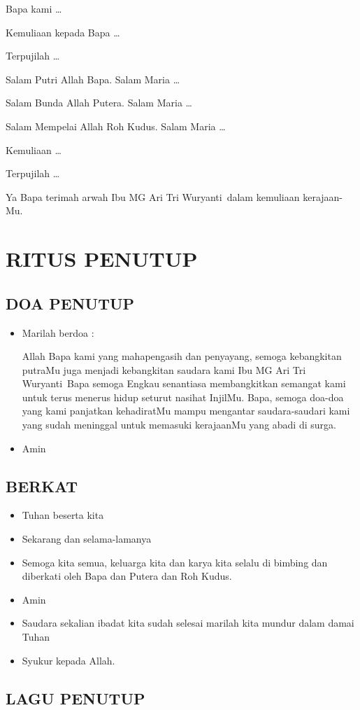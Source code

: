 \documentclass[a5paper,headsepline,titlepage,11pt,nnormalheadings,DIVcalc]{scrbook}
\newcommand{\BU}[1]{\begin{itemize} \item[U:] #1 \end{itemize}}
\newcommand{\BP}[1]{\begin{itemize} \item[P:] #1 \end{itemize}}
\newcommand{\namaalm}{Ibu MG Ari Tri Wuryanti~}
\begin{document}
Bapa kami \dots

Kemuliaan kepada Bapa \dots

Terpujilah \dots

Salam Putri Allah Bapa. Salam Maria \dots

Salam Bunda Allah Putera. Salam Maria \dots 

Salam Mempelai Allah Roh Kudus. Salam Maria \dots

Kemuliaan \dots

Terpujilah \dots

Ya Bapa terimah arwah \namaalm dalam kemuliaan kerajaan-Mu.

\section*{RITUS PENUTUP}

\subsection*{DOA PENUTUP}
\BP{Marilah berdoa :
 
Allah Bapa kami yang mahapengasih dan penyayang, 
semoga kebangkitan putraMu juga menjadi kebangkitan 
saudara kami \namaalm  Bapa semoga Engkau senantiasa 
membangkitkan semangat kami untuk terus menerus hidup 
seturut nasihat InjilMu. Bapa, semoga doa-doa yang kami 
panjatkan kehadiratMu mampu mengantar saudara-saudari 
kami yang sudah meninggal untuk memasuki kerajaanMu 
yang abadi di surga. }
\BU{Amin}

\subsection*{BERKAT}
\BP{Tuhan beserta kita}
\BU{Sekarang dan selama-lamanya}
\BP{Semoga kita semua, keluarga kita dan karya kita selalu di bimbing dan diberkati oleh Bapa dan Putera dan Roh Kudus.}

\BU{Amin}

\BP{Saudara sekalian ibadat kita sudah selesai marilah kita mundur dalam damai Tuhan}
\BU{Syukur kepada Allah.}

\subsection*{LAGU PENUTUP}
\end{document}

